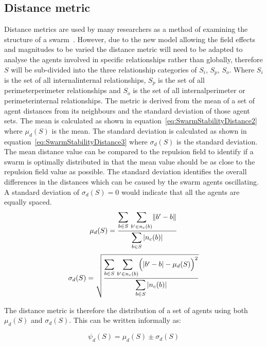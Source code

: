 \documentclass[12pt,a4paper]{IEEEtran}
\newcommand{\magn}[1]{\Vert{#1}\Vert}
\newcommand{\card}[1]{\vert{#1}\vert}
\newcommand{\vbb}[2]{#2-#1}
\begin{document}
\subsection{Distance metric}
Distance metrics are used by many researchers as a method of examining the structure of a swarm~\cite{BAFVM:06,BAF:06,elamvazhuthi2015optimal,VG:05,SW:03}. However, due to the new model allowing the field effects and magnitudes to be varied the distance metric will need to be adapted to analyse the agents involved in specific relationships rather than globally, therefore $S$ will be sub-divided into the three relationship categories of $S_i$, $S_p$, $S_{o}$. Where $S_i$ is the set of all internal\textrightarrow internal relationships, $S_p$ is the set of all perimeter\textrightarrow perimeter relationships and $S_{o}$ is the set of all internal\textrightarrow perimeter or perimeter\textrightarrow internal relationships. 
The metric is derived from the mean of a set of agent distances from its neighbours and the standard deviation of those agent sets. The mean is calculated as shown in equation~\ref{eq:SwarmStabilityDistance2} where $\mu_d(S)$ is the mean. The standard deviation is calculated as shown in equation~\ref{eq:SwarmStabilityDistance3} where $\sigma_d(S)$ is the standard deviation. The mean distance value can be compared to the repulsion field to identify if a swarm is optimally distributed in that the mean value should be as close to the repulsion field value as possible. The standard deviation identifies the overall differences in the distances which can be caused by the swarm agents oscillating. A standard deviation of $\sigma_d(S) = 0$ would indicate that all the agents are equally spaced.
\small
\begin{equation}
\label{eq:SwarmStabilityDistance2}
\mu_d(S) = \frac{\mathlarger{\sum_{b \in S}}~\mathlarger{\sum_{b' \in n_c(b)}}\magn{\vbb{b}{b'}}}{\mathlarger{\sum_{b \in S}\card{n_c(b)}}}
\end{equation}
\normalsize
\small
\begin{equation}
\label{eq:SwarmStabilityDistance3}
\sigma_d(S) = \sqrt{\frac{\mathlarger{\sum_{b \in S}}~\mathlarger{\sum_{b' \in n_c(b)}}\Big(\card{\vbb{b}{b'}} - \mu_d(S)\Big)^2}{\mathlarger{\sum_{b \in S}\card{n_c(b)}}}}
\end{equation}
\normalsize

The distance metric is therefore the distribution of a set of agents using both $\mu_d(S)$ and $\sigma_d(S)$. This can be written informally as:

\small
\begin{equation}
\label{eq:SwarmPotentialMagnitude}
\psi_d(S) = \mu_d(S)\pm \sigma_d(S)
\end{equation}
\normalsize
\end{document}
